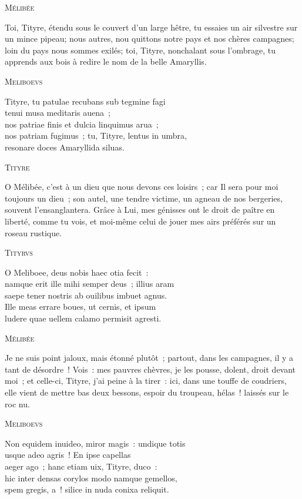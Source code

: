 \documentclass[a4paper,12pt,twoside, titlepage]{book}
\begin{document}
\begin{center}\textsc{Mélibée}\end{center}

Toi, Tityre, étendu sous le couvert d'un large hêtre, tu essaies un air silvestre sur un mince pipeau; nous autres, nou quittons notre pays et nos chères campagnes; loin du pays nous sommes exilés; toi, Tityre, nonchalant sous l'ombrage, tu apprends aux bois à redire le nom de la belle Amaryllis. 

\begin{center}\textsc{Meliboevs}\end{center}

Tityre, tu patulae recubans sub tegmine fagi\\
\app{}
tenui musa meditaris auena~;\\
nos patriae finis et dulcia linquimus arua~;\\
nos patriam fugimus~; tu, Tityre, lentus in umbra,\\
\app{} resonare doces Amaryllida siluas.\\


\begin{center}\textsc{Tityre}\end{center}

O Mélibée, c'est à un dieu que nous devons ces loisirs~; car Il sera pour moi toujours un dieu~; son autel, une tendre victime, un agneau de nos bergeries, souvent l'ensanglantera. Grâce à Lui, mes génisses ont le droit de paître en liberté, comme tu vois, et moi-même celui de jouer mes airs préférés sur un roseau rustique.

\begin{center}\textsc{Tityrvs}\end{center}

O Meliboee, deus nobis haec otia fecit~:\\
namque erit ille mihi semper deus~; illius aram\\
saepe tener nostris ab ouilibus imbuet agnus.\\
Ille meas errare boues, ut cernis, et ipsum\\
ludere quae uellem calamo permisit agresti.\\


\begin{center}\textsc{Mélibée}\end{center}

Je ne suis point jaloux, mais étonné plutôt~; partout, dans les campagnes, il y a tant de désordre~! Vois~: mes pauvres chèvres, je les pousse, dolent, droit devant moi~; et celle-ci, Tityre, j'ai peine à la tirer~: ici, dans une touffe de coudriers, elle vient de mettre bas deux bessons, espoir du troupeau, hélas~! laissés sur le roc nu.

\begin{center}\textsc{Meliboevs}\end{center}

Non equidem inuideo, miror magis~: undique totis\\
usque adeo \app{
} agris~! En ipse capellas\\
\app{
} aeger ago~; hanc etiam uix, Tityre, duco~:\\
hic inter densas corylos modo namque gemellos,\\
spem gregis, a~! silice in nuda conixa reliquit.\\
\end{document}
